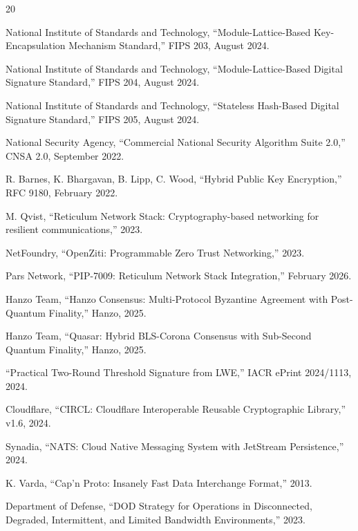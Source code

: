 \documentclass[11pt,letterpaper]{article}
\begin{document}
\begin{thebibliography}{20}

 National Institute of Standards and Technology, ``Module-Lattice-Based Key-Encapsulation Mechanism Standard,'' FIPS 203, August 2024.

 National Institute of Standards and Technology, ``Module-Lattice-Based Digital Signature Standard,'' FIPS 204, August 2024.

 National Institute of Standards and Technology, ``Stateless Hash-Based Digital Signature Standard,'' FIPS 205, August 2024.

 National Security Agency, ``Commercial National Security Algorithm Suite 2.0,'' CNSA 2.0, September 2022.

 R. Barnes, K. Bhargavan, B. Lipp, C. Wood, ``Hybrid Public Key Encryption,'' RFC 9180, February 2022.

 M. Qvist, ``Reticulum Network Stack: Cryptography-based networking for resilient communications,'' 2023.

 NetFoundry, ``OpenZiti: Programmable Zero Trust Networking,'' 2023.

 Pars Network, ``PIP-7009: Reticulum Network Stack Integration,'' February 2026.

 Hanzo Team, ``Hanzo Consensus: Multi-Protocol Byzantine Agreement with Post-Quantum Finality,'' Hanzo, 2025.

 Hanzo Team, ``Quasar: Hybrid BLS-Corona Consensus with Sub-Second Quantum Finality,'' Hanzo, 2025.

 ``Practical Two-Round Threshold Signature from LWE,'' IACR ePrint 2024/1113, 2024.

 Cloudflare, ``CIRCL: Cloudflare Interoperable Reusable Cryptographic Library,'' v1.6, 2024.

 Synadia, ``NATS: Cloud Native Messaging System with JetStream Persistence,'' 2024.

 K. Varda, ``Cap'n Proto: Insanely Fast Data Interchange Format,'' 2013.

 Department of Defense, ``DOD Strategy for Operations in Disconnected, Degraded, Intermittent, and Limited Bandwidth Environments,'' 2023.

\end{thebibliography}
\end{document}
